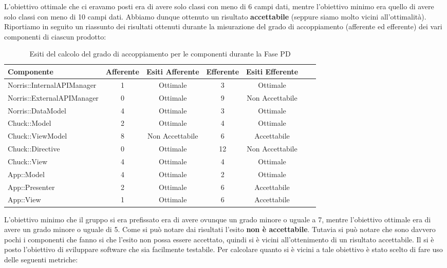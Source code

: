 				L'obiettivo ottimale che ci eravamo posti era di avere solo classi con meno di 6 campi dati, mentre l'obiettivo minimo era quello di avere solo classi con meno di 10 campi dati. Abbiamo dunque ottenuto un risultato \textbf{accettabile} (seppure siamo molto vicini all'ottimalità).\\
				Riportiamo in seguito un riassunto dei risultati ottenuti durante la misurazione del grado di accoppiamento (afferente ed efferente) dei vari componenti di ciascun prodotto:
				\begin{table}[H]
					\centering
					\begin{tabu}{| l | c | c | c | c | c | c | }
						\hline
						Componente					& Afferente & Esiti Afferente & Efferente & Esiti Efferente 	\\ \hline \hline
						Norris::InternalAPIManager	& 1 & Ottimale & 3 & Ottimale  \\ \hline
						Norris::ExternalAPIManager  & 0 & Ottimale & 9 & Non Accettabile   \\ \hline
						Norris::DataModel  			& 4 & Ottimale & 3 & Ottimale   \\ \hline
						Chuck::Model 				& 2 & Ottimale & 4 & Ottimale   \\ \hline
						Chuck::ViewModel 			& 8 & Non Accettabile & 6 & Accettabile   \\ \hline
						Chuck::Directive 			& 0 & Ottimale & 12 & Non Accettabile   \\ \hline
						Chuck::View 				& 4 & Ottimale & 4 & Ottimale   \\ \hline
						App::Model 					& 4 & Ottimale & 2 & Ottimale   \\ \hline
						App::Presenter 				& 2 & Ottimale & 6 & Accettabile   \\ \hline
						App::View 					& 1 & Ottimale & 6 & Accettabile   \\ \hline
					\end{tabu}
					\caption{Esiti del calcolo del grado di accoppiamento per le componenti durante la Fase PD}
				\end{table}
				L'obiettivo minimo che il gruppo si era prefissato era di avere ovunque un grado minore o uguale a 7, mentre l'obiettivo ottimale era di avere un grado minore o uguale di 5. Come si può notare dai risultati l'esito \textbf{non è accettabile}. Tutavia si può notare che sono davvero pochi i componenti che fanno si che l'esito non possa essere accettato, quindi si è vicini all'ottenimento di un risultato accettabile.
				Il \groupname si è posto l'obiettivo di sviluppare software che sia facilmente testabile. Per calcolare quanto si è vicini a tale obiettivo è stato scelto di fare uso delle seguenti metriche:
